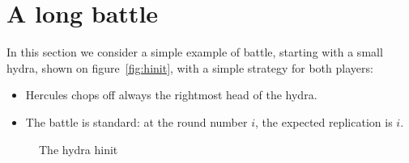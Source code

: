 \documentclass[a4paper]{book}
\begin{document}


 




\section{A long battle}
\label{sect:big-battle}


In this section we consider a simple example of battle, starting with a small hydra,
shown on figure~\vref{fig:hinit}, with a simple strategy for both players:

\begin{itemize}
\item Hercules chops off always the rightmost head of the hydra.
\item The battle is standard: at the round number $i$, the expected replication is $i$.
\end{itemize}



\begin{figure}[h]
  \centering

  \caption{The hydra hinit}
  \label{fig:hinit}
\end{figure}
\end{document}

